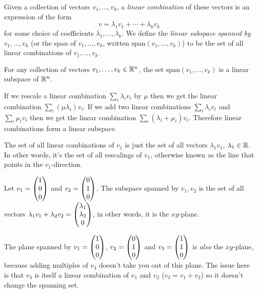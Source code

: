 \documentclass{article}
\begin{document}
\begin{Definition}
Given a collection of vectors \(v_1,\ldots,v_k\), a {\em linear
combination} of these vectors is an expression of the form
\[v=\lambda_1v_1+\cdots+\lambda_k v_k\] for some choice of
coefficients \(\lambda_1,\ldots,\lambda_k\). We define the {\em
linear subspace spanned by} \(v_1,\ldots,v_k\) (or the span of
\(v_1,\ldots,v_k\), written \(\mathrm{span}(v_1,\ldots,v_k)\)) to be
the set of all linear combinations of \(v_1,\ldots,v_k\).


\end{Definition}
\begin{Lemma}
For any collection of vectors \(v_1,\ldots,v_k\in\mathbb{R}^n\), the set
\(\mathrm{span}(v_1,\ldots,v_k)\) is a linear subspace of \(\mathbb{R}^n\).
\end{Lemma}
\begin{Proof}
If we rescale a linear combination \(\sum_i\lambda_iv_i\) by \(\mu\)
then we get the linear combination \(\sum_i(\mu\lambda_i)v_i\). If
we add two linear combinations \(\sum_i\lambda_iv_i\) and
\(\sum_i\mu_iv_i\) then we get the linear combination
\(\sum_i(\lambda_i+\mu_i)v_i\). Therefore linear combinations form a
linear subspace. \qedhere


\end{Proof}
\begin{Example}
The set of all linear combinations of \(v_1\) is just the set of all
vectors \(\lambda_1 v_1\), \(\lambda_1\in\mathbb{R}\). In other words, it's
the set of all rescalings of \(v_1\), otherwise known as the line
that points in the \(v_1\)-direction.


\end{Example}
\begin{Example}
Let \(v_1=\begin{pmatrix} 1 \\ 0 \\ 0 \end{pmatrix}\) and \(v_2=\begin{pmatrix} 0 \\ 1 \\ 0\end{pmatrix}\). The
subspace spanned by \(v_1,v_2\) is the set of all vectors
\(\lambda_1v_1+\lambda_2v_2=\begin{pmatrix} \lambda_1 \\ \lambda_2 \\ 0\end{pmatrix}\), in
other words, it is the \(xy\)-plane.


\end{Example}
\begin{Example}
The plane spanned by \(v_1=\begin{pmatrix} 1 \\ 0 \\ 0 \end{pmatrix}\), \(v_2=\begin{pmatrix} 0 \\ 1 \\ 0\end{pmatrix}\)
and \(v_3=\begin{pmatrix} 1 \\ 1 \\ 0\end{pmatrix}\) is {\em also} the \(xy\)-plane, because
adding multiples of \(v_3\) doesn't take you out of this plane. The
issue here is that \(v_3\) is itself a linear combination of \(v_1\)
and \(v_2\) (\(v_3=v_1+v_2\)) so it doesn't change the spanning set.


\end{Example}
\end{document}
